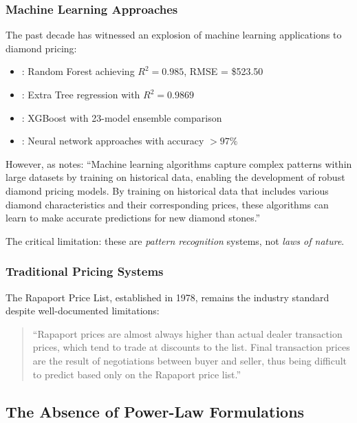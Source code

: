 \documentclass[12pt,a4paper]{article}
\theoremstyle{definition}
\theoremstyle{remark}
\begin{document}
\subsubsection{Machine Learning Approaches}

The past decade has witnessed an explosion of machine learning applications to diamond pricing:

\begin{itemize}
\item \citet{sharma2023diamond}: Random Forest achieving $R^2 = 0.985$, RMSE = \$523.50
\item \citet{kumar2024diamond}: Extra Tree regression with $R^2 = 0.9869$
\item \citet{patel2024predictive}: XGBoost with 23-model ensemble comparison
\item \citet{alsuraihi2020machine}: Neural network approaches with accuracy $>97\%$
\end{itemize}

However, as \citet{chu2017pricing} notes: ``Machine learning algorithms capture complex patterns within large datasets by training on historical data, enabling the development of robust diamond pricing models. By training on historical data that includes various diamond characteristics and their corresponding prices, these algorithms can learn to make accurate predictions for new diamond stones.''

The critical limitation: these are \textit{pattern recognition} systems, not \textit{laws of nature}.

\subsubsection{Traditional Pricing Systems}

The Rapaport Price List, established in 1978, remains the industry standard despite well-documented limitations:

\begin{quote}
``Rapaport prices are almost always higher than actual dealer transaction prices, which tend to trade at discounts to the list. Final transaction prices are the result of negotiations between buyer and seller, thus being difficult to predict based only on the Rapaport price list.'' \citep{chu2017pricing}
\end{quote}

\subsection{The Absence of Power-Law Formulations}
\end{document}
